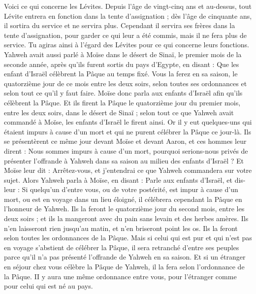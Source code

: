 \begin{multicols}{2}
Voici ce qui concerne les Lévites. Depuis l'âge de vingt-cinq ans et au-dessus, tout Lévite entrera en fonction dans la tente d'assignation ;
dès l'âge de cinquante ans, il sortira du service et ne servira plus.
Cependant il servira ses frères dans la tente d'assignation, pour garder ce qui leur a été commis, mais il ne fera plus de service. Tu agiras ainsi à l'égard des Lévites pour ce qui concerne leurs fonctions.
\VerseOne{}Yahweh avait aussi parlé à Moïse dans le désert de Sinaï, le premier mois de la seconde année, après qu'ils furent sortis du pays d'Egypte, en disant :
Que les enfant d'Israël célèbrent la Pâque au temps fixé.
Vous la ferez en sa saison, le quatorzième jour de ce mois entre les deux soirs, selon toutes ses ordonnances et selon tout ce qu'il y faut faire.
Moïse donc parla aux enfants d'Israël afin qu'ils célèbrent la Pâque.
Et ils firent la Pâque le quatorzième jour du premier mois, entre les deux soirs, dans le désert de Sinaï ; selon tout ce que Yahweh avait commandé à Moïse, les enfants d'Israël le firent ainsi.
Or il y eut quelques-uns qui étaient impurs à cause d'un mort et qui ne purent célébrer la Pâque ce jour-là. Ils se présentèrent ce même jour devant Moïse et devant Aaron,
et ces hommes leur dirent : Nous sommes impurs à cause d'un mort, pourquoi serions-nous privés de présenter l'offrande à Yahweh dans sa saison au milieu des enfants d'Israël ?
Et Moïse leur dit : Arrêtez-vous, et j'entendrai ce que Yahweh commandera sur votre sujet.
Alors Yahweh parla à Moïse, en disant :
Parle aux enfants d'Israël, et dis-leur : Si quelqu'un d'entre vous, ou de votre postérité, est impur à cause d'un mort, ou est en voyage dans un lieu éloigné, il célébrera cependant la Pâque en l'honneur de Yahweh.
Ils la feront le quatorzième jour du second mois, entre les deux soirs ; et ils la mangeront avec du pain sans levain et des herbes amères.
Ils n'en laisseront rien jusqu'au matin, et n'en briseront point les os. Ils la feront selon toutes les ordonnances de la Pâque.
Mais si celui qui est pur et qui n'est pas en voyage s'abstient de célébrer la Pâque, il sera retranché d'entre ses peuples parce qu'il n'a pas présenté l'offrande de Yahweh en sa saison.
Et si un étranger en séjour chez vous célèbre la Pâque de Yahweh, il la fera selon l'ordonnance de la Pâque. II y aura une même ordonnance entre vous, pour l'étranger comme pour celui qui est né au pays.

\end{multicols}
